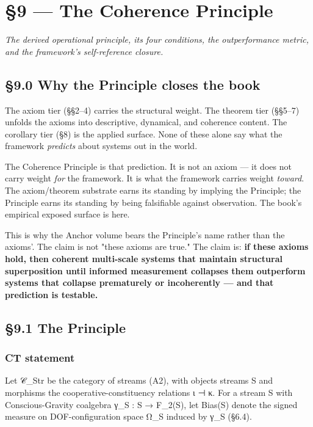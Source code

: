 \documentclass[11pt, openany]{book}
\newcommand{\sectionbreak}{\clearpage}
\begin{document}
\chapter{§9 — The Coherence Principle}


\textit{The derived operational principle, its four conditions, the outperformance metric, and the framework's self-reference closure.}

\sectionbreak

\section{§9.0 Why the Principle closes the book}

The axiom tier (§§2–4) carries the structural weight. The theorem tier (§§5–7) unfolds the axioms into descriptive, dynamical, and coherence content. The corollary tier (§8) is the applied surface. None of these alone say what the framework \textit{predicts} about systems out in the world.

The Coherence Principle is that prediction. It is not an axiom --- it does not carry weight \textit{for} the framework. It is what the framework carries weight \textit{toward}. The axiom/theorem substrate earns its standing by implying the Principle; the Principle earns its standing by being falsifiable against observation. The book's empirical exposed surface is here.

This is why the Anchor volume bears the Principle's name rather than the axioms'. The claim is not "these axioms are true." The claim is: \textbf{if these axioms hold, then coherent multi-scale systems that maintain structural superposition until informed measurement collapses them outperform systems that collapse prematurely or incoherently --- and that prediction is testable.}

\sectionbreak

\section{§9.1 The Principle}

\subsection{CT statement}

Let 𝒞\_\allowbreak{}Str be the category of streams (A2), with objects streams S and morphisms the cooperative-constituency relations ι ⊣ κ. For a stream S with Conscious-Gravity coalgebra γ\_\allowbreak{}S : S → F\_\allowbreak{}2(S), let Bias(S) denote the signed measure on DOF-configuration space Ω\_\allowbreak{}S induced by γ\_\allowbreak{}S (§6.4).
\end{document}
